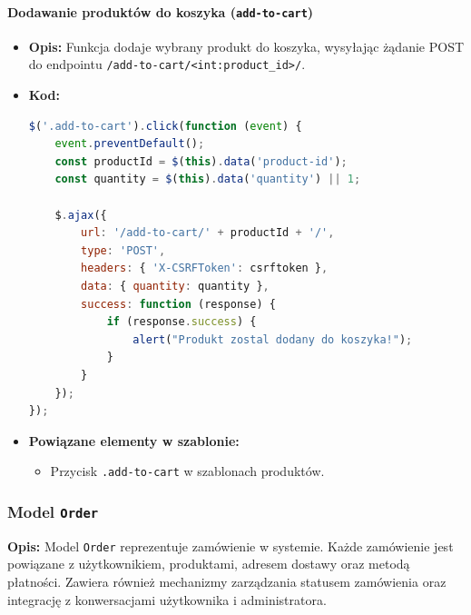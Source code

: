 \documentclass[12pt,a4paper,oneside]{article}
\theoremstyle{definition}
\numberwithin{equation}{section}
\begin{document}
\paragraph{Dodawanie produktów do koszyka (\texttt{add-to-cart})}
\begin{itemize}
    \item \textbf{Opis:}  
    Funkcja dodaje wybrany produkt do koszyka, wysyłając żądanie POST do endpointu \texttt{/add-to-cart/<int:product\_id>/}.
    \item \textbf{Kod:}
\begin{lstlisting}[language=JavaScript, caption=Kod funkcji add-to-cart]
$('.add-to-cart').click(function (event) {
    event.preventDefault();
    const productId = $(this).data('product-id');
    const quantity = $(this).data('quantity') || 1;

    $.ajax({
        url: '/add-to-cart/' + productId + '/',
        type: 'POST',
        headers: { 'X-CSRFToken': csrftoken },
        data: { quantity: quantity },
        success: function (response) {
            if (response.success) {
                alert("Produkt zostal dodany do koszyka!");
            }
        }
    });
});
\end{lstlisting}
    \item \textbf{Powiązane elementy w szablonie:}
    \begin{itemize}
        \item Przycisk \texttt{.add-to-cart} w szablonach produktów.
    \end{itemize}
\end{itemize}


% 
% 
\subsubsection{Model \texttt{Order}}

\textbf{Opis:}  
Model \texttt{Order} reprezentuje zamówienie w systemie. Każde zamówienie jest powiązane z użytkownikiem, produktami, adresem dostawy oraz metodą płatności. Zawiera również mechanizmy zarządzania statusem zamówienia oraz integrację z konwersacjami użytkownika i administratora.
\end{document}
